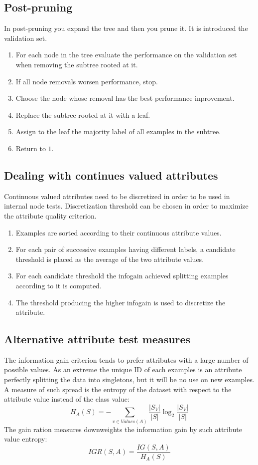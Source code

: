 	\subsection{Post-pruning}
	In post-pruning you expand the tree and then you prune it.
	It is introduced the validation set.
	\begin{enumerate}
		\item For each node in the tree evaluate the performance on the validation set when removing the subtree rooted at it.
		\item If all node removals worsen performance, stop.
		\item Choose the node whose removal has the best performance inprovement.
		\item Replace the subtree rooted at it with a leaf.
		\item Assign to the leaf the majority label of all examples in the subtree.
		\item Return to $1$.
	\end{enumerate}

	\subsection{Dealing with continues valued attributes}
	Continuous valued attributes need to be discretized in order to be used in internal node tests.
	Discretization threshold can be chosen in order to maximize the attribute quality criterion.
	\begin{enumerate}
		\item Examples are sorted according to their continuous attribute values.
		\item For each pair of successive examples having different labels, a candidate threshold is placed as the average of the two attribute values.
		\item For each candidate threshold the infogain achieved splitting examples according to it is computed.
		\item The threshold producing the higher infogain is used to discretize the attribute.
	\end{enumerate}
	
	\subsection{Alternative attribute test measures}
	The information gain criterion tends to prefer attributes with a large number of possible values.
	As an extreme the unique ID of each examples is an attribute perfectly splitting the data into singletons, but it will be no use on new examples.
	A measure of such spread is the entropy of the dataset with respect to the attribute value instead of the class value:
	$$H_A(S) = -\sum\limits_{v\in Values(A)}\dfrac{|S_V|}{|S|}\log_2\dfrac{|S_V|}{|S|}$$
	The gain ration measures downweights the information gain by such attribute value entropy:
	$$IGR(S,A) = \dfrac{IG(S,A)}{H_A(S)}$$
	
